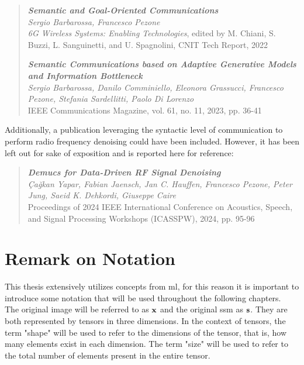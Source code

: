\begin{quotation}
\noindent \textit{\textbf{\large Semantic and Goal-Oriented Communications}}\\
\textit{Sergio Barbarossa, Francesco Pezone}\\
\textit{6G Wireless Systems: Enabling Technologies}, edited by M. Chiani, S. Buzzi, L. Sanguinetti, and U. Spagnolini, CNIT Tech Report, 2022

\vspace{0.2cm}

\noindent \textit{\textbf{\large Semantic Communications based on Adaptive Generative Models and Information Bottleneck}}\\
\textit{Sergio Barbarossa, Danilo Comminiello, Eleonora Grassucci, Francesco Pezone, Stefania Sardellitti, Paolo Di Lorenzo}\\
IEEE Communications Magazine, vol. 61, no. 11, 2023, pp. 36-41
\end{quotation}
\noindent Additionally, a publication leveraging the syntactic level of communication to perform radio frequency denoising could have been included. However, it has been left out for sake of exposition and is reported here for reference:
\begin{quotation}
\noindent \textit{\textbf{\large Demucs for Data-Driven RF Signal Denoising}}\\
\textit{Çağkan Yapar, Fabian Jaensch, Jan C. Hauffen, Francesco Pezone, Peter Jung, Saeid K. Dehkordi, Giuseppe Caire}\\
Proceedings of 2024 IEEE International Conference on Acoustics, Speech, and Signal Processing Workshops (ICASSPW), 2024, pp. 95-96
\end{quotation}


\section{Remark on Notation}
This thesis extensively utilizes concepts from \gls{ml}, for this reason it is important to introduce some notation that will be used throughout the following chapters. \\
The original image will be referred to as $\mathbf{x}$ and the original \gls{ssm} as $\mathbf{s}$. They are both represented by tensors in three dimensions. In the context of tensors, the term "shape" will be used to refer to the dimensions of the tensor, that is, how many elements exist in each dimension. The term "size" will be used to refer to the total number of elements present in the entire tensor.

